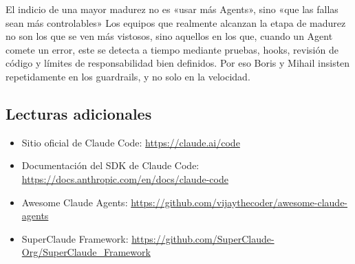 \begin{knowledgebox}{El indicio de una mayor madurez no es «usar más Agents», sino «que las fallas sean más controlables»}
Los equipos que realmente alcanzan la etapa de madurez no son los que se ven más vistosos, sino aquellos en los que, cuando un Agent comete un error, este se detecta a tiempo mediante pruebas, hooks, revisión de código y límites de responsabilidad bien definidos. Por eso Boris y Mihail insisten repetidamente en los guardrails, y no solo en la velocidad.
\end{knowledgebox}

\subsection{Lecturas adicionales}

\begin{itemize}
    \item Sitio oficial de Claude Code: \url{https://claude.ai/code}
    \item Documentación del SDK de Claude Code: \url{https://docs.anthropic.com/en/docs/claude-code}
    \item Awesome Claude Agents: \url{https://github.com/vijaythecoder/awesome-claude-agents}
    \item SuperClaude Framework: \url{https://github.com/SuperClaude-Org/SuperClaude_Framework}
\end{itemize}



